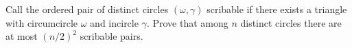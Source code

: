 Call the ordered pair of distinct circles $(\omega, \gamma)$ scribable if there exists a triangle with circumcircle $\omega$ and incircle $\gamma$. Prove that among $n$ distinct circles there are at most $(n/2)^2$ scribable pairs.

